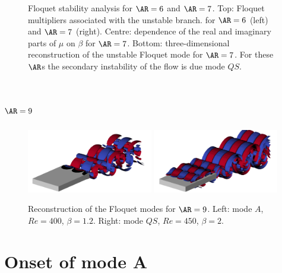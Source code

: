 \documentclass{jfm}
\begin{document}
\begin{figure}
  \caption{Floquet stability analysis for $\AR=6$ and $\AR=7$. Top: Floquet multipliers associated with the unstable branch. for $\AR=6$ (left) and $\AR=7$ (right). Centre: dependence of the real and imaginary parts of $\mu$ on $\beta$ for $\AR=7$. Bottom: three-dimensional reconstruction of the unstable Floquet mode for $\AR=7$. For these $\AR$s the secondary instability of the flow is due mode $QS$.}
  \label{fig:mult_AR7s}
\end{figure}

\section{$\AR=9$}

\begin{figure}
  \centering
  \includegraphics[width=0.49\textwidth]{./fig/AR9s/Floquet_AR9_Re400_beta1p2_modeA.png}  
  \includegraphics[width=0.49\textwidth]{./fig/AR9s/Floquet_AR9_Re450_beta2_modeQS.png}
  \caption{Reconstruction of the Floquet modes for $\AR=9$. Left: mode $A$, $Re=400$, $\beta=1.2$. Right: mode $QS$, $Re=450$, $\beta=2$.}
  \label{fig:mult_AR9s}
\end{figure}

\section{Onset of mode A}
\end{document}
